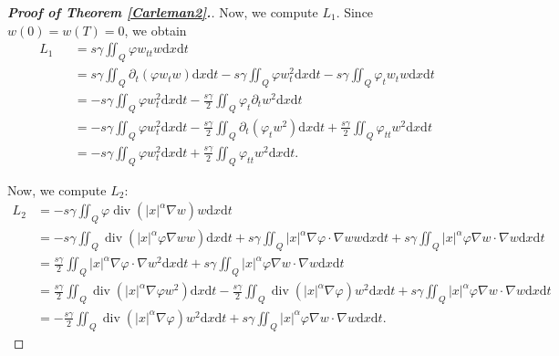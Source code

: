 \documentclass[11pt]{article}
\numberwithin{equation}{section}
\def\pt{\partial}
\def\vp{\varphi}
\def\bf{\textbf}
\def\pt{\partial}
\def\al{\alpha}
\def\ga{\gamma}
\def\f{\frac}
\def\df{\mathrm d}
\DeclareMathOperator{\Div}{div}
\begin{document}
\begin{proof}[{\rm \bf { Proof of  Theorem \ref{Carleman2}.}}]
			
			Now, we compute $L_1$. Since $w(0)=w(T)=0$, we obtain
			\begin{eqnarray*}
				L_1
				&&=s\ga \iint_Q \vp w_{tt} w\df x\df t\\
				&&=s\ga\iint_Q \pt_t(\vp w_tw)\df x\df t-s\ga\iint_Q \vp w_t^2\df x\df t-s\ga \iint_Q\vp_tw_tw\df x\df t\\
				&&=-s\ga\iint_Q\vp w_t^2\df x\df t -\f{s\ga }{2}\iint_Q\vp_t\pt_tw^2\df x\df t\\
				&&=-s\ga\iint_Q\vp w_t^2\df x\df t-\f{s\ga }{2}\iint_Q \pt_t(\vp_tw^2)\df x\df t+\f{s\ga }{2}\iint_Q \vp_{tt}w^2\df x\df t\\
				&&=-s\ga\iint_Q\vp w_t^2\df x\df t+\f{s\ga }{2}\iint_Q \vp_{tt}w^2\df x\df t.
			\end{eqnarray*}
			
			
			
			Now, we compute $L_2$:
			\begin{equation*}
				\begin{split}
					L_2
					&=-s\ga \iint_Q \vp \Div(|x|^\al \nabla w)w\df x\df t\\
					&=-s\ga \iint_Q\Div\left(|x|^\al \vp \nabla w w\right)\df x\df t+s\ga\iint_Q|x|^\al \nabla\vp\cdot \nabla w w\df x\df t+s\ga\iint_Q|x|^\al \vp \nabla w\cdot \nabla w\df x\df t\\
					&=\f{s\ga}{2}\iint_Q|x|^\al \nabla \vp\cdot \nabla w^2\df x\df t+s\ga \iint_Q|x|^\al \vp\nabla w\cdot \nabla w\df x\df t\\
					&=\f{s\ga}{2}\iint_Q\Div\left(|x|^\al \nabla \vp w^2\right)\df x\df t-\f{s\ga}{2}\iint_Q\Div\left(|x|^\al \nabla \vp\right)w^2\df x\df t+s\ga\iint_Q|x|^\al \vp \nabla w\cdot \nabla w\df x\df t\\
					&=-\f{s\ga}{2}\iint_Q\Div\left(|x|^\al \nabla \vp\right)w^2\df x\df t+s\ga\iint_Q|x|^\al \vp \nabla w\cdot \nabla w\df x\df t.
				\end{split}
			\end{equation*}
			

\end{proof}
\end{document}
